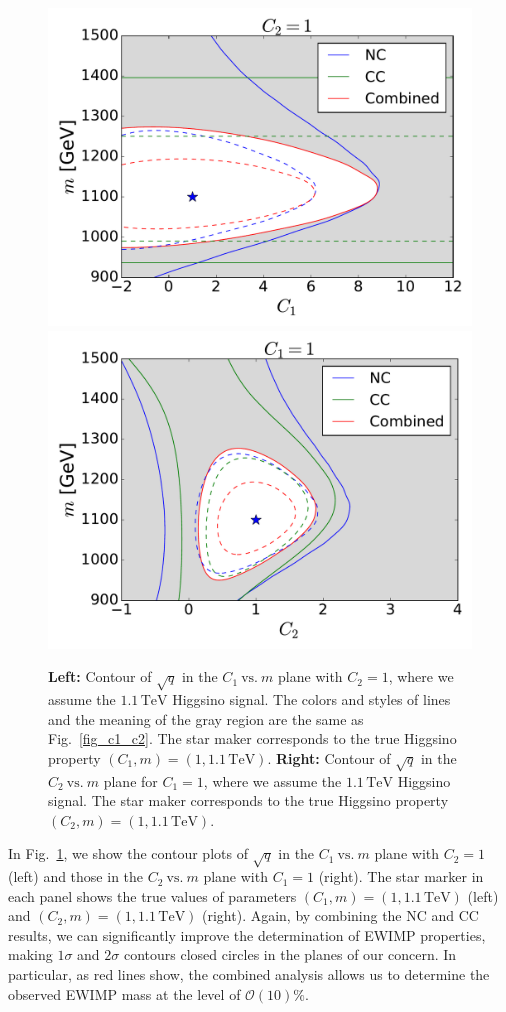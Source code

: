 \documentclass[12pt, a4paper]{article}
\begin{document}
\begin{figure}[t]
 \centering
 \includegraphics[width=0.48\linewidth]{C1_vs_mass_Higgsino.pdf}
 \includegraphics[width=0.48\linewidth]{C2_vs_mass_Higgsino.pdf}
 \caption{\textbf{Left:} Contour of $\sqrt{q}$ in the
 $C_1~\mathrm{vs.}~m$ plane with $C_2 = 1$,
 where we assume the $1.1\,\mathrm{TeV}$ Higgsino signal.
 The colors and
 styles of lines and the meaning of the gray region are the same as
 Fig.~\ref{fig_c1_c2}.  The star maker corresponds to the true Higgsino
 property $(C_1, m) = (1, 1.1\,\mathrm{TeV})$. \textbf{Right:} Contour
 of $\sqrt{q}$ in the $C_2~\mathrm{vs.}~m$ plane for $C_1 = 1$,
 where we assume the $1.1\,\mathrm{TeV}$ Higgsino signal.
The star maker corresponds to the true Higgsino property $(C_2, m) = (1,
1.1\,\mathrm{TeV})$.
 }
 \label{fig_c1_m}
\end{figure}

In Fig.~\ref{fig_c1_m}, we show the contour
plots of $\sqrt{q}$ in the $C_1~\mathrm{vs.}~m$ plane with $C_2=1$ (left)
and those in the $C_2~\mathrm{vs.}~m$ plane with $C_1=1$ (right).
The star marker in each panel shows the true values of
parameters $(C_1, m) = (1, 1.1\,\mathrm{TeV})$ (left) and $(C_2, m) =
(1, 1.1\,\mathrm{TeV})$ (right).  Again, by combining the NC and CC
results, we can significantly improve the determination of EWIMP
properties, making $1\sigma$ and $2\sigma$ contours closed circles in
the planes of our concern.  In particular, as red lines show, the
combined analysis allows us to determine the observed EWIMP mass at the
level of $\mathcal{O}(10)\%$.
\end{document}
